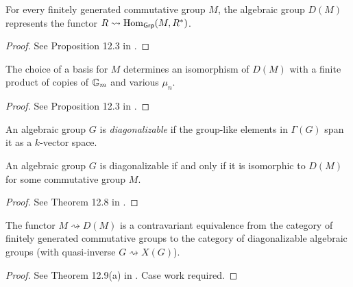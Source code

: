 \begin{proposition}
  \label{DM_func}
  For every finitely generated commutative group $M$, the algebraic group $D(M)$
  represents the functor $R \rightsquigarrow \operatorname{Hom}_{\mathsf{Grp}}(M,R^*)$.
\end{proposition}
\begin{proof}
  See Proposition 12.3 in \cite{Milne_2017}.
\end{proof}


\begin{proposition}
  \label{DM_struct}
  The choice of a basis for $M$ determines an isomorphism of $D(M)$
  with a finite product of copies of ${\mathbb G_m}$ and various $\mu_n$.
\end{proposition}
\begin{proof}
  See Proposition 12.3 in \cite{Milne_2017}.
\end{proof}


\begin{definition}
  \label{diag}
  An algebraic group $G$ is \emph{diagonalizable}
  if the group-like elements in $\Gamma(G)$ span it as a $k$-vector space.
\end{definition}

\begin{theorem}
  \label{diag_iff_D}
  An algebraic group $G$ is diagonalizable
  if and only if it is isomorphic to $D(M)$ for some commutative group $M$.
\end{theorem}
\begin{proof}
  See Theorem 12.8 in \cite{Milne_2017}.
\end{proof}

\begin{theorem}
  \label{congr_fggrp_diag}
  The functor $M\rightsquigarrow D(M)$ is a contravariant equivalence
  from the category of finitely generated commutative groups to the category of
  diagonalizable algebraic groups (with quasi-inverse $G \rightsquigarrow X(G)$).
\end{theorem}
\begin{proof}
  See Theorem 12.9(a) in \cite{Milne_2017}. Case work required.
\end{proof}
